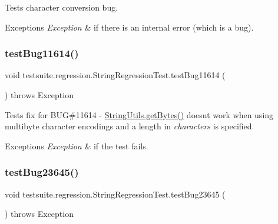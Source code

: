 Tests character conversion bug.


\begin{DoxyExceptions}{Exceptions}
{\em Exception} & if there is an internal error (which is a bug). \\
\hline
\end{DoxyExceptions}
\mbox{\label{classtestsuite_1_1regression_1_1_string_regression_test_a06cd6f2ea6096ebef7516e5ed1ff3659}} 
\subsubsection{\texorpdfstring{test\+Bug11614()}{testBug11614()}}
{\footnotesize\ttfamily void testsuite.\+regression.\+String\+Regression\+Test.\+test\+Bug11614 (\begin{DoxyParamCaption}{ }\end{DoxyParamCaption}) throws Exception}

Tests fix for B\+UG\#11614 -\/ \mbox{\hyperlink{classcom_1_1mysql_1_1cj_1_1util_1_1_string_utils_a460ad9e9bb0873d806d2078891d8d416}{String\+Utils.\+get\+Bytes()}} doesn\textquotesingle{}t work when using multibyte character encodings and a length in {\itshape characters} is specified.


\begin{DoxyExceptions}{Exceptions}
{\em Exception} & if the test fails. \\
\hline
\end{DoxyExceptions}
\mbox{\label{classtestsuite_1_1regression_1_1_string_regression_test_a0b910fb41d304e6b938f8908dfffe0bf}} 
\subsubsection{\texorpdfstring{test\+Bug23645()}{testBug23645()}}
{\footnotesize\ttfamily void testsuite.\+regression.\+String\+Regression\+Test.\+test\+Bug23645 (\begin{DoxyParamCaption}{ }\end{DoxyParamCaption}) throws Exception}

